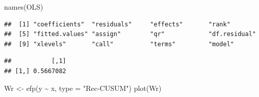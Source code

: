\documentclass[
]{article}
\newenvironment{Shaded}{\begin{snugshade}}{\end{snugshade}}
\newcommand{\AttributeTok}[1]{\textcolor[rgb]{0.77,0.63,0.00}{#1}}
\newcommand{\DecValTok}[1]{\textcolor[rgb]{0.00,0.00,0.81}{#1}}
\newcommand{\FunctionTok}[1]{\textcolor[rgb]{0.00,0.00,0.00}{#1}}
\newcommand{\NormalTok}[1]{#1}
\newcommand{\OtherTok}[1]{\textcolor[rgb]{0.56,0.35,0.01}{#1}}
\newcommand{\SpecialCharTok}[1]{\textcolor[rgb]{0.00,0.00,0.00}{#1}}
\newcommand{\StringTok}[1]{\textcolor[rgb]{0.31,0.60,0.02}{#1}}
\begin{document}
\begin{Shaded}
\begin{Highlighting}[]
 \FunctionTok{names}\NormalTok{(OLS)}
\end{Highlighting}
\end{Shaded}

\begin{verbatim}
##  [1] "coefficients"  "residuals"     "effects"       "rank"         
##  [5] "fitted.values" "assign"        "qr"            "df.residual"  
##  [9] "xlevels"       "call"          "terms"         "model"
\end{verbatim}

\begin{Shaded}
\end{Shaded}

\begin{verbatim}
##           [,1]
## [1,] 0.5667082
\end{verbatim}

\begin{Shaded}
\begin{Highlighting}[]
\NormalTok{Wr }\OtherTok{\textless{}{-}} \FunctionTok{efp}\NormalTok{(y }\SpecialCharTok{\textasciitilde{}}\NormalTok{ x, }\AttributeTok{type =} \StringTok{"Rec{-}CUSUM"}\NormalTok{)}
\FunctionTok{plot}\NormalTok{(Wr)}
\end{Highlighting}
\end{Shaded}
\end{document}
